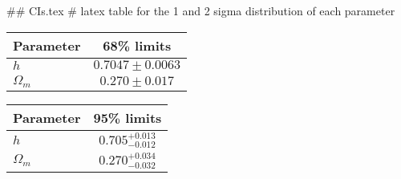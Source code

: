 ## CIs.tex
# latex table for the 1 and 2 sigma distribution of each parameter

\begin{tabular} { l  c}
 Parameter &  68\% limits\\
\hline
{\boldmath$h              $} & $0.7047\pm 0.0063          $\\
{\boldmath$\Omega_m       $} & $0.270\pm 0.017            $\\
\hline
\end{tabular}

\begin{tabular} { l  c}
 Parameter &  95\% limits\\
\hline
{\boldmath$h              $} & $0.705^{+0.013}_{-0.012}   $\\
{\boldmath$\Omega_m       $} & $0.270^{+0.034}_{-0.032}   $\\
\hline
\end{tabular}
